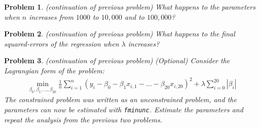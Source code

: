 \documentclass[12pt, a4paper]{article}
\newcommand{\abs}[1]{\left\vert{#1}\right\vert}
\newtheorem{problem}{Problem}
\begin{document}
\begin{problem}
(continuation of previous problem)
What happens to the parameters when \(n\) increases from \(1000\) to \(10,000\) and to \(100,000\)?
\end{problem}

\begin{problem}
(continuation of previous problem)
What happens to the final squared-errors of the regression when \(\lambda\) increases?
\end{problem}

\begin{problem}
(continuation of previous problem) (Optional)
Consider the Lagrangian form of the problem:
\begin{align*}
\min_{\beta_0,\beta_1,\ldots,\beta_{20}}{\frac{1}{n}\sum_{i=1}^n(y_i-\beta_0-\beta_1x_{i, 1} - \ldots - \beta_{20}x_{i, 20})^2 + \lambda\sum_{i=0}^{20}\abs{\beta_i}}
\end{align*}
The constrained problem was written as an unconstrained problem, and the parameters can now be estimated with \texttt{fminunc}.
Estimate the parameters and repeat the analysis from the previous two problems.
\end{problem}
\newpage
\printbibliography
\newpage
\end{document}
